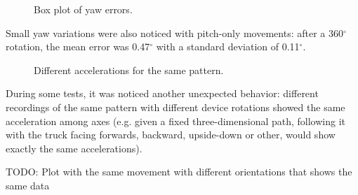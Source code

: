 \begin{center}
	\begin{figure}[ht]
		\caption{Box plot of yaw errors.}
	\end{figure}
\end{center}

Small yaw variations were also noticed with pitch-only movements: after a 360$^{\circ}$ rotation, the mean error was 0.47$^{\circ}$ with a standard deviation of 0.11$^{\circ}$.

\begin{center}
	\begin{figure}[ht]
		\caption{Different accelerations for the same pattern.}
	\end{figure}
\end{center}

During some tests, it was noticed another unexpected behavior: different recordings of the same pattern with different device rotations showed the same acceleration among axes (e.g. given a fixed three-dimensional path, following it with the truck facing forwards, backward, upside-down or other, would show exactly the same accelerations).
\bigbreak

TODO: Plot with the same movement with different orientations that shows the same data
\bigbreak

